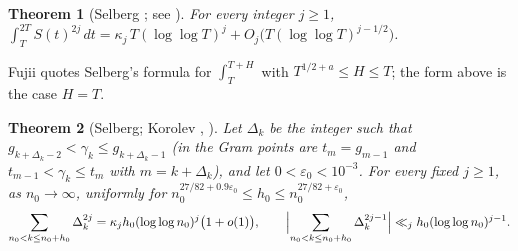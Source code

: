 \documentclass[preprint,12pt]{elsarticle}
\numberwithin{equation}{section}
\theoremstyle{plain}
\newtheorem{theorem}{Theorem}[section]
\theoremstyle{definition}
\theoremstyle{remark}
\begin{document}
\begin{theorem}[Selberg {\cite{Selberg1946a}}; see {\cite[p.~225]{Fujii1974}}]\label{thm:known_selberg_moments}
For every integer $j\ge1$, $\int_T^{2T}S(t)^{2j}\,dt=\kappa_j\,T(\log\log T)^j+O_j\bigl(T(\log\log T)^{j-1/2}\bigr)$.
\end{theorem}
Fujii \cite[p.~225]{Fujii1974} quotes Selberg's formula for $\int_T^{T+H}$ with $T^{1/2+a}\le H\le T$; the form above is the case $H=T$.

\begin{theorem}[Selberg; Korolev {\cite{KorolevIzv2012}}, {\cite[Thm.~4.2, p.~73]{KorolevPIM2012}}]\label{thm:known_korolev}
Let $\Delta_k$ be the integer such that $g_{k+\Delta_k-2}<\gamma_k\le g_{k+\Delta_k-1}$ (in \cite{KorolevPIM2012} the Gram points are $t_m=g_{m-1}$ and $t_{m-1}<\gamma_k\le t_m$ with $m=k+\Delta_k$), and let $0<\varepsilon_0<10^{-3}$. For every fixed $j\ge1$, as $n_0\to\infty$, uniformly for $n_0^{27/82+0.9\varepsilon_0}\le h_0\le n_0^{27/82+\varepsilon_0}$,
\begin{equation}
\sum_{n_0<k\le n_0+h_0}\Delta_k^{2j}=\kappa_jh_0(\log\log n_0)^j\bigl(1+o(1)\bigr),\qquad
\Bigl|\sum_{n_0<k\le n_0+h_0}\Delta_k^{2j-1}\Bigr|\ll_j h_0(\log\log n_0)^{j-1}.
\label{eq:korolev_moments}
\end{equation}
\end{theorem}
\end{document}
